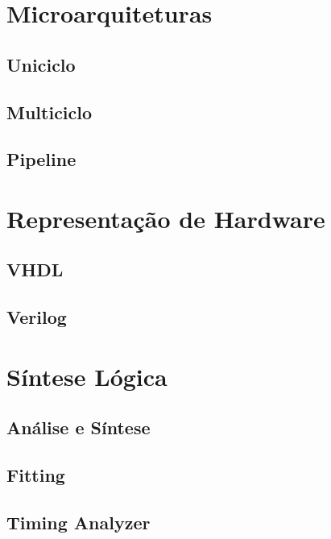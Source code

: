 \section{Microarquiteturas}
{}

    \subsection{Uniciclo}
    {}

    \subsection{Multiciclo}
    {}

    \subsection{Pipeline}
    {}

\section{Representação de Hardware}
{}

    \subsection{VHDL}
    {}

    \subsection{Verilog}
    {}

\section{Síntese Lógica}
{}

    \subsection{Análise e Síntese}
    {}

    \subsection{Fitting}
    {}

    \subsection{Timing Analyzer}
    {}

